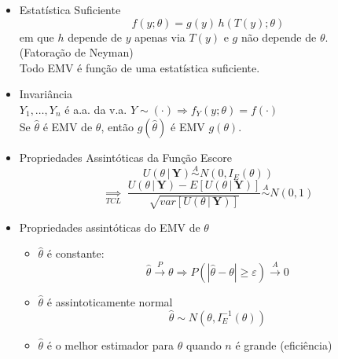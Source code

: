 \documentclass[11pt,a4paper]{article}
\newcommand{\vt}[1]{\underset{\sim}{#1}}      %
\begin{document}
\begin{itemize}
\begin{itemize}[label=$\cdot$]
\begin{itemize}
      \item $\theta_0$ é o chute inicial obtido pelo Método dos Momentos
      \item Critério de parada:
      \[ |\theta^{j+1}-\theta^j| < \varepsilon \text{ (arbitrário)} \]
      \[ \left(\theta^{j+1} = \theta^j - H^{-1}(\vt{\theta}^j)\,U(\vt{\theta}^j)\right) \]
    \end{itemize}
    \item Método Escore de Fischer
    \begin{itemize}
      \item $\vt{\theta}^{j+1} = \vt{\theta}^j + I_E^{-1}(\vt{\theta}^j)\,U(\vt{\theta}^j)$
      \item optim(.) no R programming language.
    \end{itemize}
  \end{itemize}
  \item Estatística Suficiente
  \[ f(y;\theta) = g(y)\,h(T(y);\theta) \]
  em que $h$ depende de $y$ apenas via $T(y)$ e $g$ não depende de $\theta$. \\
  (Fatoração de Neyman) \\
  Todo EMV é função de uma estatística suficiente.
  \item Invariância \\
  $Y_1,\ldots,Y_n$ é a.a. da v.a. $Y\sim(\cdot) \Rightarrow f_Y(y;\theta) = f(\cdot)$ \\
  Se $\hat{\theta}$ é EMV de $\theta$, então $g(\hat{\theta})$ é EMV $g(\theta)$.
  \item Propriedades Assintóticas da Função Escore
  \[ U(\theta\,|\,\mathbf{Y}) \overset{A}{\sim} N(0,I_E(\theta)) \]
  \[ \underset{TCL}{\Rightarrow}\; \frac{U(\theta\,|\,\mathbf{Y}) - E[U(\theta\,|\,\mathbf{Y})]}{\sqrt{var[U(\theta\,|\,\mathbf{Y})]}} \overset{A}{\sim} N(0,1) \]
  \item Propriedades assintóticas do EMV de $\theta$
  \begin{itemize}[label=$\cdot$]
    \item $\hat{\theta}$ é constante:
    \[ \hat{\theta} \xrightarrow{\;P\;} \theta \Rightarrow P(|\hat{\theta}-\theta|\geq\varepsilon) \xrightarrow{\;A\;} 0 \]
    \item $\hat{\theta}$ é assintoticamente normal
    \[ \hat{\theta} \sim N(\theta,I_E^{-1}(\theta)) \]
    \item $\hat{\theta}$ é o melhor estimador para $\theta$ quando $n$ é grande (eficiência)
  \end{itemize}
\end{itemize}
\end{document}
